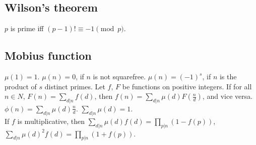 \documentclass[12pt]{extarticle}
\begin{document}
\begin{multicols*}{2}
\subsection{Wilson's theorem} $p$ is prime iff $(p - 1)! \equiv -1 \pmod p$.

\subsection{Mobius function}
$\mu(1) = 1$. $\mu(n) = 0$, if $n$ is not squarefree.
$\mu(n) = (-1)^s$, if $n$ is the product of $s$ distinct primes.
Let $f$, $F$ be functions on positive integers.
If for all $n \in N$, $F(n)=\sum_{d|n} f(d)$, then $f(n) = \sum_{d|n} \mu(d) F(\frac{n}{d})$,
and vice versa. \quad
$\phi(n) = \sum_{d|n} \mu(d) \frac{n}{d}$.
\quad $\sum_{d|n} \mu(d) = 1$. \\
If $f$ is multiplicative, then $\sum_{d|n} \mu(d) f(d) = \prod_{p|n}(1-f(p))$,
$\sum_{d|n} \mu(d)^2 f(d) = \prod_{p|n} (1+f(p))$.





\end{multicols*}
\end{document}
